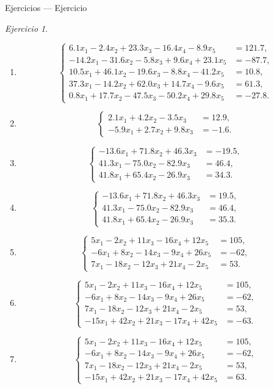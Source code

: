 \documentclass[aspectratio=169,11pt]{beamer}
\theoremstyle{remark}
\newtheorem{Ejer}[definicion]{Ejercicio}
\newcommand{\sistema}[1]{\[\left\{\begin{aligned}#1\end{aligned}\right.\]}
\begin{document}
\begin{frame}[shrink=5]{Ejercicios — Ejercicio}
\begin{Ejer}
\begin{enumerate}[resume]
\item \sistema{
6.1x_1-2.4x_2+23.3x_3-16.4x_4-8.9x_5&=121.7,\\
-14.2x_1-31.6x_2-5.8x_3+9.6x_4+23.1x_5&=-87.7,\\
10.5x_1+46.1x_2-19.6x_3-8.8x_4-41.2x_5&=10.8,\\
37.3x_1-14.2x_2+62.0x_3+14.7x_4-9.6x_5&=61.3,\\
0.8x_1+17.7x_2-47.5x_3-50.2x_4+29.8x_5&=-27.8.
}

\item \sistema{
2.1x_1+4.2x_2-3.5x_3&=12.9,\\
-5.9x_1+2.7x_2+9.8x_3&=-1.6.
}

\item \sistema{
-13.6x_1+71.8x_2+46.3x_3&=-19.5,\\
41.3x_1-75.0x_2-82.9x_3&=46.4,\\
41.8x_1+65.4x_2-26.9x_3&=34.3.
}

\item \sistema{
-13.6x_1+71.8x_2+46.3x_3&=19.5,\\
41.3x_1-75.0x_2-82.9x_3&=46.4,\\
41.8x_1+65.4x_2-26.9x_3&=35.3.
}

\item \sistema{
5x_1-2x_2+11x_3-16x_4+12x_5&=105,\\
-6x_1+8x_2-14x_3-9x_4+26x_5&=-62,\\
7x_1-18x_2-12x_3+21x_4-2x_5&=53.
}

\item \sistema{
5x_1-2x_2+11x_3-16x_4+12x_5&=105,\\
-6x_1+8x_2-14x_3-9x_4+26x_5&=-62,\\
7x_1-18x_2-12x_3+21x_4-2x_5&=53,\\
-15x_1+42x_2+21x_3-17x_4+42x_5&=-63.
}

\item \sistema{
5x_1-2x_2+11x_3-16x_4+12x_5&=105,\\
-6x_1+8x_2-14x_3-9x_4+26x_5&=-62,\\
7x_1-18x_2-12x_3+21x_4-2x_5&=53,\\
-15x_1+42x_2+21x_3-17x_4+42x_5&=63.
}

\end{enumerate}
\end{Ejer}
\end{frame}
\end{document}
